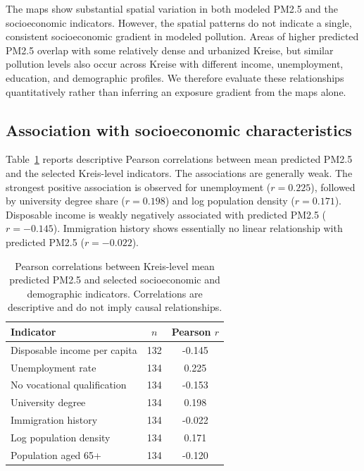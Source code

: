 \documentclass[english, a4paper, numbers=noenddot]{article}
\begin{document}
The maps show substantial spatial variation in both modeled PM2.5 and the
socioeconomic indicators. However, the spatial patterns do not indicate a
single, consistent socioeconomic gradient in modeled pollution. Areas of
higher predicted PM2.5 overlap with some relatively dense and urbanized
Kreise, but similar pollution levels also occur across Kreise with different
income, unemployment, education, and demographic profiles. We therefore
evaluate these relationships quantitatively rather than inferring an exposure
gradient from the maps alone.

\subsection{Association with socioeconomic characteristics}

Table~\ref{tab:pm25_socioeconomic_correlations} reports descriptive Pearson
correlations between mean predicted PM2.5 and the selected Kreis-level
indicators. The associations are generally weak. The strongest positive
association is observed for unemployment ($r=0.225$), followed by university
degree share ($r=0.198$) and log population density ($r=0.171$). Disposable
income is weakly negatively associated with predicted PM2.5 ($r=-0.145$).
Immigration history shows essentially no linear relationship with predicted
PM2.5 ($r=-0.022$).

\begin{table}[ht]
\centering
\caption{Pearson correlations between Kreis-level mean predicted PM2.5 and
selected socioeconomic and demographic indicators. Correlations are
descriptive and do not imply causal relationships.}
\label{tab:pm25_socioeconomic_correlations}
\begin{tabular}{lcc}
\toprule
\textbf{Indicator} & \textbf{$n$} & \textbf{Pearson $r$} \\
\midrule
Disposable income per capita      & 132 & -0.145 \\
Unemployment rate                 & 134 &  0.225 \\
No vocational qualification       & 134 & -0.153 \\
University degree                 & 134 &  0.198 \\
Immigration history               & 134 & -0.022 \\
Log population density            & 134 &  0.171 \\
Population aged 65+               & 134 & -0.120 \\
\bottomrule
\end{tabular}
\end{table}
\end{document}
